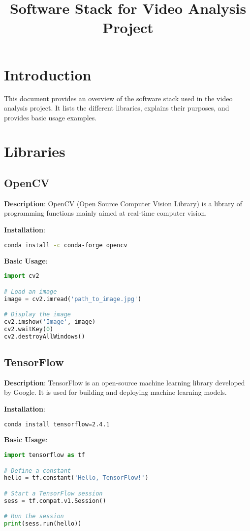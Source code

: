 \documentclass{article}
\title{Software Stack for Video Analysis Project}
\author{}
\date{}
\begin{document}
\maketitle

\section{Introduction}
This document provides an overview of the software stack used in the video analysis project. It lists the different libraries, explains their purposes, and provides basic usage examples.

\section{Libraries}

\subsection{OpenCV}
\textbf{Description}: OpenCV (Open Source Computer Vision Library) is a library of programming functions mainly aimed at real-time computer vision.

\textbf{Installation}:
\begin{lstlisting}[language=bash]
conda install -c conda-forge opencv
\end{lstlisting}

\textbf{Basic Usage}:
\begin{lstlisting}[language=python]
import cv2

# Load an image
image = cv2.imread('path_to_image.jpg')

# Display the image
cv2.imshow('Image', image)
cv2.waitKey(0)
cv2.destroyAllWindows()
\end{lstlisting}

\subsection{TensorFlow}
\textbf{Description}: TensorFlow is an open-source machine learning library developed by Google. It is used for building and deploying machine learning models.

\textbf{Installation}:
\begin{lstlisting}[language=bash]
conda install tensorflow=2.4.1
\end{lstlisting}

\textbf{Basic Usage}:
\begin{lstlisting}[language=python]
import tensorflow as tf

# Define a constant
hello = tf.constant('Hello, TensorFlow!')

# Start a TensorFlow session
sess = tf.compat.v1.Session()

# Run the session
print(sess.run(hello))
\end{lstlisting}
\end{document}
